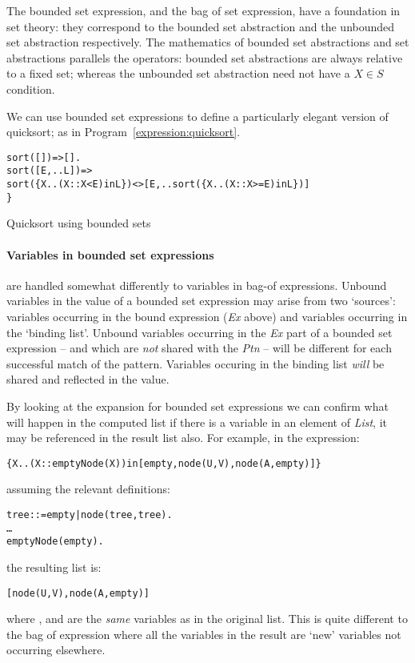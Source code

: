 \begin{aside}
The bounded set expression, and the bag of set expression, have a foundation in set theory: they correspond to the bounded set abstraction and the unbounded set abstraction respectively. The mathematics of bounded set abstractions and set abstractions parallels the \go operators: bounded set abstractions are always relative to a fixed set; whereas the unbounded set abstraction need not have a $X\in{}S$ condition.
\end{aside}

We can use bounded set expressions to define a particularly elegant version of quicksort; as in Program~\vref{expression:quicksort}.
\begin{program}
\vspace{0.5ex}
\begin{alltt}
sort([])=>[].
sort([E,..L]) => 
  sort(\{X..(X::X<E) in L\})<>[E,..sort(\{X..(X::X>=E) in L\})]
\}
\end{alltt}
\vspace{-2ex}
\caption{Quicksort using bounded sets\label{expression:quicksort}}
\end{program}


\paragraph{Variables in bounded set expressions} are handled somewhat differently to variables in bag-of expressions. Unbound variables in the value of a bounded set expression may arise from two `sources': variables occurring in the bound expression (\emph{Ex} above) and variables occurring in the `binding list'. Unbound variables occurring in the \emph{Ex} part of a bounded set expression -- and which are \emph{not} shared with the \emph{Ptn} -- will be different for each successful match of the pattern. Variables occuring in the binding list \emph{will} be shared and reflected in the value.

By looking at the expansion for bounded set expressions we can confirm what will happen in the computed list if there is a variable in an element of \emph{List}, it may be referenced in the result list also. For example, in the expression:
\begin{alltt}
\{X..(X::\nasf{}emptyNode(X)) in [empty,node(U,V),node(A,empty)]\}
\end{alltt}
assuming the relevant definitions:
\begin{alltt}
tree ::= empty | node(tree,tree).
\ldots
emptyNode(empty).
\end{alltt}
the resulting list is:
\begin{alltt}
[node(U,V), node(A,empty)]
\end{alltt}
where ,  and  are the \emph{same} variables as in the original list. This is quite different to the bag of expression where all the variables in the result are `new' variables not occurring elsewhere.

